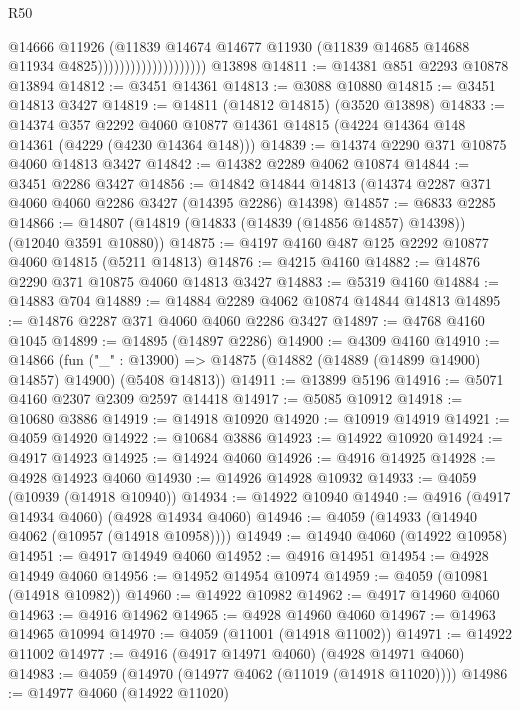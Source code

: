 \begin{lexlean}{R50}
\begin{coremodule}
                                        @14666
                                        @11926
                                        (@11839
                                          @14674
                                          @14677
                                          @11930
                                          (@11839 @14685 @14688 @11934 @4825))))))))))))))))))))
    @13898
@14811 := @14381 @851 @2293 @10878 @13894
@14812 := @3451 @14361
@14813 := @3088 @10880
@14815 := @3451 @14813 @3427
@14819 := @14811 (@14812 @14815) (@3520 @13898)
@14833 := @14374
    @357
    @2292
    @4060
    @10877
    @14361
    @14815
    (@4224 @14364 @148 @14361 (@4229 (@4230 @14364 @148)))
@14839 := @14374 @2290 @371 @10875 @4060 @14813 @3427
@14842 := @14382 @2289 @4062 @10874
@14844 := @3451 @2286 @3427
@14856 := @14842 @14844 @14813 (@14374 @2287 @371 @4060 @4060 @2286 @3427 (@14395 @2286) @14398)
@14857 := @6833 @2285
@14866 := @14807 (@14819 (@14833 (@14839 (@14856 @14857) @14398)) (@12040 @3591 @10880))
@14875 := @4197 @4160 @487 @125 @2292 @10877 @4060 @14815 (@5211 @14813)
@14876 := @4215 @4160
@14882 := @14876 @2290 @371 @10875 @4060 @14813 @3427
@14883 := @5319 @4160
@14884 := @14883 @704
@14889 := @14884 @2289 @4062 @10874 @14844 @14813
@14895 := @14876 @2287 @371 @4060 @4060 @2286 @3427
@14897 := @4768 @4160 @1045
@14899 := @14895 (@14897 @2286)
@14900 := @4309 @4160
@14910 := @14866
    (fun ("_" : @13900) => @14875 (@14882 (@14889 (@14899 @14900) @14857) @14900) (@5408 @14813))
@14911 := @13899 @5196
@14916 := @5071 @4160 @2307 @2309 @2597 @14418
@14917 := @5085 @10912
@14918 := @10680 @3886
@14919 := @14918 @10920
@14920 := @10919 @14919
@14921 := @4059 @14920
@14922 := @10684 @3886
@14923 := @14922 @10920
@14924 := @4917 @14923
@14925 := @14924 @4060
@14926 := @4916 @14925
@14928 := @4928 @14923 @4060
@14930 := @14926 @14928 @10932
@14933 := @4059 (@10939 (@14918 @10940))
@14934 := @14922 @10940
@14940 := @4916 (@4917 @14934 @4060) (@4928 @14934 @4060)
@14946 := @4059 (@14933 (@14940 @4062 (@10957 (@14918 @10958))))
@14949 := @14940 @4060 (@14922 @10958)
@14951 := @4917 @14949 @4060
@14952 := @4916 @14951
@14954 := @4928 @14949 @4060
@14956 := @14952 @14954 @10974
@14959 := @4059 (@10981 (@14918 @10982))
@14960 := @14922 @10982
@14962 := @4917 @14960 @4060
@14963 := @4916 @14962
@14965 := @4928 @14960 @4060
@14967 := @14963 @14965 @10994
@14970 := @4059 (@11001 (@14918 @11002))
@14971 := @14922 @11002
@14977 := @4916 (@4917 @14971 @4060) (@4928 @14971 @4060)
@14983 := @4059 (@14970 (@14977 @4062 (@11019 (@14918 @11020))))
@14986 := @14977 @4060 (@14922 @11020)

\end{coremodule}
\end{lexlean}
